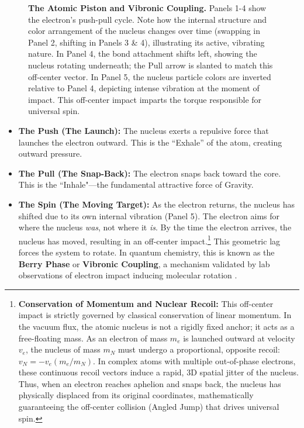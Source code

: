 \documentclass[11pt, a4paper]{article}
\begin{document}
\begin{figure}[!ht]
\caption{\textbf{The Atomic Piston and Vibronic Coupling.} Panels 1-4 show the electron's push-pull cycle. Note how the internal structure and color arrangement of the nucleus changes over time (swapping in Panel 2, shifting in Panels 3 \& 4), illustrating its active, vibrating nature. In Panel 4, the bond attachment shifts left, showing the nucleus rotating underneath; the Pull arrow is slanted to match this off-center vector. In Panel 5, the nucleus particle colors are inverted relative to Panel 4, depicting intense vibration at the moment of impact. This off-center impact imparts the torque responsible for universal spin.}
\label{fig:atomic_piston}
\end{figure}

\begin{itemize}
  \item \textbf{The Push (The Launch):} The nucleus exerts a repulsive force that launches the electron outward. This is the ``Exhale'' of the atom, creating outward pressure.
  
  \item \textbf{The Pull (The Snap-Back):} The electron snaps back toward the core. This is the ``Inhale"—the fundamental attractive force of Gravity.
  
  \item \textbf{The Spin (The Moving Target):} As the electron returns, the nucleus has shifted due to its own internal vibration (Panel 5). The electron aims for where the nucleus \textit{was}, not where it \textit{is}. By the time the electron arrives, the nucleus has moved, resulting in an off-center impact.\footnote{\textbf{Conservation of Momentum and Nuclear Recoil:} This off-center impact is strictly governed by classical conservation of linear momentum. In the vacuum flux, the atomic nucleus is not a rigidly fixed anchor; it acts as a free-floating mass. As an electron of mass $m_e$ is launched outward at velocity $v_e$, the nucleus of mass $m_N$ must undergo a proportional, opposite recoil: $v_N = -v_e (m_e / m_N)$. In complex atoms with multiple out-of-phase electrons, these continuous recoil vectors induce a rapid, 3D spatial jitter of the nucleus. Thus, when an electron reaches aphelion and snaps back, the nucleus has physically displaced from its original coordinates, mathematically guaranteeing the off-center collision (Angled Jump) that drives universal spin.} This geometric lag forces the system to rotate. In quantum chemistry, this is known as the \textbf{Berry Phase} or \textbf{Vibronic Coupling}, a mechanism validated by lab observations of electron impact inducing molecular rotation \cite{faure2001}.
\end{itemize}
\end{document}
